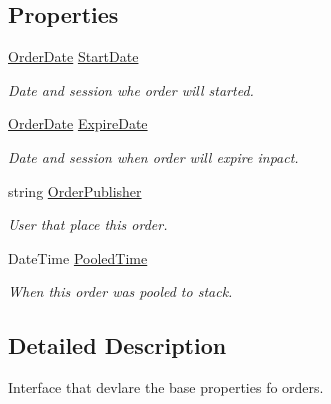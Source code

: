 \subsection*{Properties}
\begin{DoxyCompactItemize}
\item 
\mbox{\hyperlink{struct_teacher_handbook_1_1_core_1_1_orders_1_1_order_date}{Order\+Date}} \mbox{\hyperlink{interface_teacher_handbook_1_1_core_1_1_orders_1_1_i_order_a095dc6b1b492dee172826971fa7ec0b2}{Start\+Date}}
\begin{DoxyCompactList}\small\item\em Date and session whe order will started. \end{DoxyCompactList}\item 
\mbox{\hyperlink{struct_teacher_handbook_1_1_core_1_1_orders_1_1_order_date}{Order\+Date}} \mbox{\hyperlink{interface_teacher_handbook_1_1_core_1_1_orders_1_1_i_order_a869d2255133d85c06a68a1f566c8f584}{Expire\+Date}}
\begin{DoxyCompactList}\small\item\em Date and session when order will expire inpact. \end{DoxyCompactList}\item 
string \mbox{\hyperlink{interface_teacher_handbook_1_1_core_1_1_orders_1_1_i_order_abc8bec467e3650f9db2ea0e383025bee}{Order\+Publisher}}
\begin{DoxyCompactList}\small\item\em User that place this order. \end{DoxyCompactList}\item 
Date\+Time \mbox{\hyperlink{interface_teacher_handbook_1_1_core_1_1_orders_1_1_i_order_afb608aeb72b8634be6d2a10a861356d2}{Pooled\+Time}}
\begin{DoxyCompactList}\small\item\em When this order was pooled to stack. \end{DoxyCompactList}\end{DoxyCompactItemize}


\subsection{Detailed Description}
Interface that devlare the base properties fo orders. 



